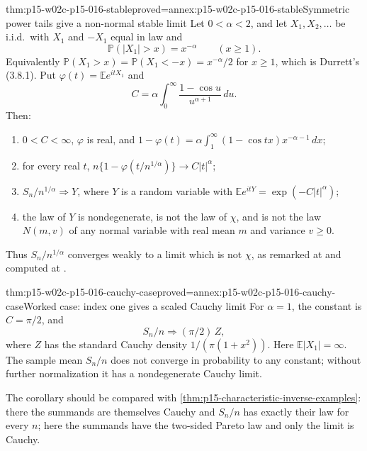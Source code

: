\begin{hbtheorem}{thm:p15-w02c-p15-016-stable}{proved=annex:p15-w02c-p15-016-stable}{Symmetric power tails give a non-normal stable limit}
Let \(0<\alpha<2\), and let \(X_1,X_2,\ldots\) be i.i.d.\ with
\(X_1\) and \(-X_1\) equal in law and
\[
 \mathbb P(|X_1|>x)=x^{-\alpha}\qquad(x\geq1).
 \]
Equivalently \(\mathbb P(X_1>x)=\mathbb P(X_1<-x)=x^{-\alpha}/2\)
for \(x\geq1\), which is Durrett's (3.8.1). Put
\(\varphi(t)=\mathbb Ee^{itX_1}\) and
\[
 C=\alpha\int_0^\infty\frac{1-\cos u}{u^{\alpha+1}}\,du .
 \]
Then:
\begin{enumerate}
\item \(0<C<\infty\), \(\varphi\) is real, and
 \(1-\varphi(t)=\alpha\int_1^\infty(1-\cos tx)x^{-\alpha-1}\,dx\);
\item for every real \(t\),
 \(n\{1-\varphi(t/n^{1/\alpha})\}\to C|t|^\alpha\);
\item \(S_n/n^{1/\alpha}\Rightarrow Y\), where \(Y\) is a random
 variable with \(\mathbb Ee^{itY}=\exp(-C|t|^\alpha)\);
\item the law of \(Y\) is nondegenerate, is not the law of \(\chi\),
 and is not the law \(N(m,v)\) of any normal variable with real mean
 \(m\) and variance \(v\geq0\).
\end{enumerate}
Thus \(S_n/n^{1/\alpha}\) converges weakly to a limit which is not
\(\chi\), as remarked at \cite[p.~152]{DurrettPTEAuthor2019} and
computed at \cite[Section~3.8, pp.~182--183]{DurrettPTEAuthor2019}.
\end{hbtheorem}

\begin{hbcorollary}{thm:p15-w02c-p15-016-cauchy-case}{proved=annex:p15-w02c-p15-016-cauchy-case}{Worked case: index one gives a scaled Cauchy limit}
For \(\alpha=1\), the constant is \(C=\pi/2\), and
\[
 S_n/n\Rightarrow(\pi/2)\,Z,
 \]
where \(Z\) has the standard Cauchy density \(1/(\pi(1+x^2))\).
Here \(\mathbb E|X_1|=\infty\). The sample mean \(S_n/n\) does not
converge in probability to any constant; without further normalization
it has a nondegenerate Cauchy limit.
\end{hbcorollary}

The corollary should be compared with
\cref{thm:p15-characteristic-inverse-examples}: there the summands are
themselves Cauchy and \(S_n/n\) has exactly their law for every \(n\);
here the summands have the two-sided Pareto law and only the limit is
Cauchy.


